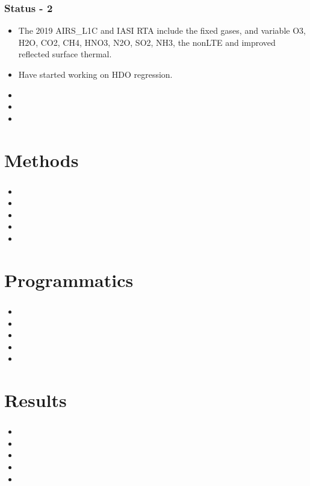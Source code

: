 \documentclass[10pt,t]{beamer}
\begin{document}
\begin{frame}
  \frametitle{Status - 2}
  \begin{itemize}
  \item The 2019 AIRS\_L1C and IASI RTA include the fixed gases, and variable O3, H2O, CO2, CH4, HNO3, N2O, SO2, NH3, the nonLTE and improved reflected surface thermal. 
  \item Have started working on HDO regression.
  \item 
  \item 
  \item 
    
  \end{itemize}
\end{frame}

\section{Methods}
\begin{frame}
  \frametitle{}
  \begin{itemize}
  \item 
  \item 
  \item 
  \item 
  \item 
    
  \end{itemize}
\end{frame}

\section{Programmatics}
\begin{frame}
  \frametitle{}
  \begin{itemize}
  \item 
  \item 
  \item 
  \item 
  \item 
    
  \end{itemize}
\end{frame}

\section{Results}
\begin{frame}
  \frametitle{}
  \begin{itemize}
  \item 
  \item 
  \item 
  \item 
  \item 
    
  \end{itemize}
\end{frame}
\end{document}

